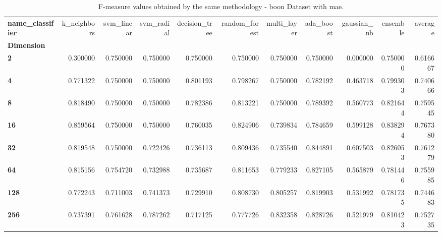 \begin{table}
\centering
\caption{F-measure values obtained by the same methodology - boon Dataset with mae.}
\label{f-measure_boon_mae-reproduction}
\begin{tabular}{lrrrrrrrrrr}
\toprule
\textbf{name\_classifier} &  k\_neighbors &  svm\_linear &  svm\_radial &  decision\_tree &  random\_forest &  multi\_layer &  ada\_boost &  gaussian\_nb &  ensemble &   average \\
\textbf{Dimension} &              &             &             &                &                &              &            &              &           &           \\
\midrule
\textbf{2        } &     0.300000 &    0.750000 &    0.750000 &       0.750000 &       0.750000 &     0.750000 &   0.750000 &     0.000000 &  0.750000 &  0.616667 \\
\textbf{4        } &     0.771322 &    0.750000 &    0.750000 &       0.801193 &       0.798267 &     0.750000 &   0.782192 &     0.463718 &  0.799303 &  0.740666 \\
\textbf{8        } &     0.818490 &    0.750000 &    0.750000 &       0.782386 &       0.813221 &     0.750000 &   0.789392 &     0.560773 &  0.821644 &  0.759545 \\
\textbf{16       } &     0.859564 &    0.750000 &    0.750000 &       0.760035 &       0.824906 &     0.739834 &   0.784659 &     0.599128 &  0.838294 &  0.767380 \\
\textbf{32       } &     0.819548 &    0.750000 &    0.722426 &       0.736113 &       0.809436 &     0.735540 &   0.844891 &     0.607503 &  0.826053 &  0.761279 \\
\textbf{64       } &     0.815156 &    0.754720 &    0.732988 &       0.735687 &       0.811653 &     0.779233 &   0.827105 &     0.565879 &  0.781446 &  0.755985 \\
\textbf{128      } &     0.772243 &    0.711003 &    0.741373 &       0.729910 &       0.808730 &     0.805257 &   0.819903 &     0.531992 &  0.781735 &  0.744683 \\
\textbf{256      } &     0.737391 &    0.761628 &    0.787262 &       0.717125 &       0.777726 &     0.832358 &   0.828726 &     0.521979 &  0.810423 &  0.752735 \\
\bottomrule
\end{tabular}
\end{table}
